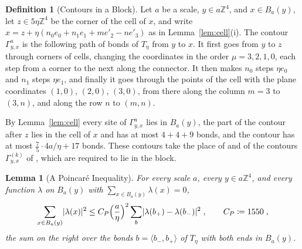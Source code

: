 \documentclass[11pt]{preprint}
\DeclarePairedDelimiter{\abs}{\lvert}{\rvert}
\numberwithin{equation}{section}
\newtheorem{lemma}[theorem]{Lemma}
\theoremstyle{definition}
\newtheorem{definition}[theorem]{Definition}
\theoremstyle{remark}
\theoremstyle{plain}
\begin{document}
\begin{definition}[Contours in a Block]\label{def:contours}
Let $a$ be a scale, $y \in a\mathbb Z^4$, and $x \in B_a(y)$, let $z \in 5\eta\mathbb Z^4$ be the corner of the cell of $x$, and write $x = z + \eta(n_0e_0 + n_1e_1 + me'_2 - ne'_3)$ as in Lemma~\ref{lem:cell}(i). The contour $\Gamma^a_{y,x}$ is the following path of bonds of $T_\eta$ from $y$ to $x$. It first goes from $y$ to $z$ through corners of cells, changing the coordinates in the order $\mu = 3, 2, 1, 0$, each step from a corner to the next along the connector. It then makes $n_0$ steps $\eta e_0$ and $n_1$ steps $\eta e_1$, and finally it goes through the points of the cell with the plane coordinates $(1, 0)$, $(2, 0)$, $(3, 0)$, from there along the column $m = 3$ to $(3, n)$, and along the row $n$ to $(m, n)$.
\end{definition}

By Lemma~\ref{lem:cell} every site of $\Gamma^a_{y,x}$ lies in $B_a(y)$, the part of the contour after $z$ lies in the cell of $x$ and has at most $4 + 4 + 9$ bonds, and the contour has at most $\frac75 \cdot 4a/\eta + 17$ bonds. These contours take the place of \cite[(1.7), p.~18]{BalabanPRT1} and of the contours $\Gamma^{(k)}_{y,x}$ of \cite[(1.4), p.~572]{BalabanRDG}, which are required to lie in the block.

\begin{lemma}[A Poincar\'e Inequality]\label{lem:poincare}
For every scale $a$, every $y \in a\mathbb Z^4$, and every function $\lambda$ on $B_a(y)$ with $\sum_{x \in B_a(y)}\lambda(x) = 0$,
\begin{equation}\label{eq:poincare}
    \sum_{x \in B_a(y)}\abs{\lambda(x)}^2 \leq C_P\Bigl(\frac{a}{\eta}\Bigr)^2\sum_{b}\abs{\lambda(b_+) - \lambda(b_-)}^2\;,
    \qquad
    C_P \coloneqq 1550\;,
\end{equation}
the sum on the right over the bonds $b = \langle b_-, b_+\rangle$ of $T_\eta$ with both ends in $B_a(y)$.
\end{lemma}
\end{document}

